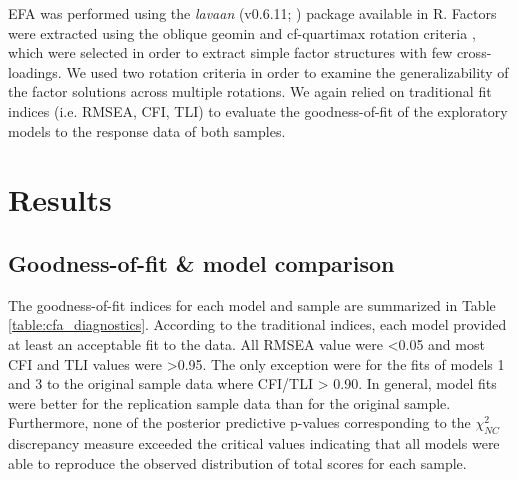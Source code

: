 \documentclass[letterpaper,man,natbib,floatsintext,longtable]{apa6}
\begin{document}
EFA was performed using the \textit{lavaan} (v0.6.11; \citealt{lavaan}) package available in R. Factors were extracted using the oblique geomin \citep{yates1987multivariate} and cf-quartimax rotation criteria \citep{crawford1970general}, which were selected in order to extract simple factor structures with few cross-loadings. We used two rotation criteria in order to examine the generalizability of the factor solutions across multiple rotations. We again relied on traditional fit indices (i.e. RMSEA, CFI, TLI) to evaluate the goodness-of-fit of the exploratory models to the response data of both samples.

\section{Results}

\subsection{Goodness-of-fit \& model comparison}

The goodness-of-fit indices for each model and sample are summarized in Table \ref{table:cfa_diagnostics}. According to the traditional indices, each model provided at least an acceptable fit to the data. All RMSEA value were <0.05 and most CFI and TLI values were >0.95. The only exception were for the fits of models 1 and 3 to the original sample data where CFI/TLI > 0.90. In general, model fits were better for the replication sample data than for the original sample. Furthermore, none of the posterior predictive p-values corresponding to the $\chi^2_{NC}$ discrepancy measure exceeded the critical values indicating that all models were able to reproduce the observed distribution of total scores for each sample.
\end{document}
